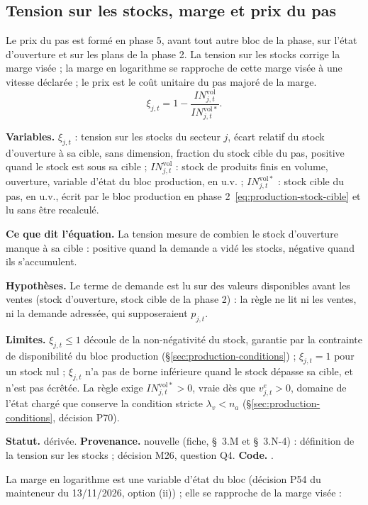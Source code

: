 \documentclass[11pt,a4paper]{article}
\newcommand{\variables}{\par\noindent\textbf{Variables.} }
\newcommand{\sens}{\par\noindent\textbf{Ce que dit l'équation.} }
\newcommand{\hyp}{\par\noindent\textbf{Hypothèses.} }
\newcommand{\limites}{\par\noindent\textbf{Limites.} }
\newcommand{\code}[1]{\texttt{\detokenize{#1}}}
\newcommand{\tracabilite}[3]{\par\smallskip\noindent\textbf{Statut.} #1. \textbf{Provenance.} #2. \textbf{Code.} \code{#3}.}
\begin{document}
\subsection{Tension sur les stocks, marge et prix du pas}
\label{sec:prix-marge}
Le prix du pas est formé en phase 5, avant tout autre bloc de la phase, sur l'état d'ouverture et sur les plans de la phase 2. La tension sur les stocks corrige la marge visée ; la marge en logarithme se rapproche de cette marge visée à une vitesse déclarée ; le prix est le coût unitaire du pas majoré de la marge.
\begin{equation}\label{eq:prix-tension-stocks}
\xi_{j,t} = 1 - \frac{\mathit{IN}^{\mathrm{vol}}_{j,t}}{\mathit{IN}^{\mathrm{vol}\ast}_{j,t}} .
\end{equation}
\begin{lecture}
\variables $\xi_{j,t}$ : tension sur les stocks du secteur $j$, écart relatif du stock d'ouverture à sa cible, sans dimension, fraction du stock cible du pas, positive quand le stock est sous sa cible ; $\mathit{IN}^{\mathrm{vol}}_{j,t}$ : stock de produits finis en volume, ouverture, variable d'état du bloc production, en u.v. ; $\mathit{IN}^{\mathrm{vol}\ast}_{j,t}$ : stock cible du pas, en u.v., écrit par le bloc production en phase 2~\eqref{eq:production-stock-cible} et lu sans être recalculé.
\sens La tension mesure de combien le stock d'ouverture manque à sa cible : positive quand la demande a vidé les stocks, négative quand ils s'accumulent.
\hyp Le terme de demande est lu sur des valeurs disponibles avant les ventes (stock d'ouverture, stock cible de la phase 2) : la règle ne lit ni les ventes, ni la demande adressée, qui supposeraient $p_{j,t}$.
\limites $\xi_{j,t} \le 1$ découle de la non-négativité du stock, garantie par la contrainte de disponibilité du bloc production (\S\ref{sec:production-conditions}) ; $\xi_{j,t} = 1$ pour un stock nul ; $\xi_{j,t}$ n'a pas de borne inférieure quand le stock dépasse sa cible, et n'est pas écrêtée. La règle exige $\mathit{IN}^{\mathrm{vol}\ast}_{j,t} > 0$, vraie dès que $v^e_{j,t} > 0$, domaine de l'état chargé que conserve la condition stricte $\lambda_v < n_a$ (\S\ref{sec:production-conditions}, décision P70).
\tracabilite{dérivée}{nouvelle (fiche, \S~3.M et \S~3.N-4) : définition de la tension sur les stocks ; décision M26, question Q4}{nations.blocs.prix.tension_sur_les_stocks}
\end{lecture}
La marge en logarithme est une variable d'état du bloc (décision P54 du mainteneur du 13/11/2026, option (ii)) ; elle se rapproche de la marge visée :
\end{document}
